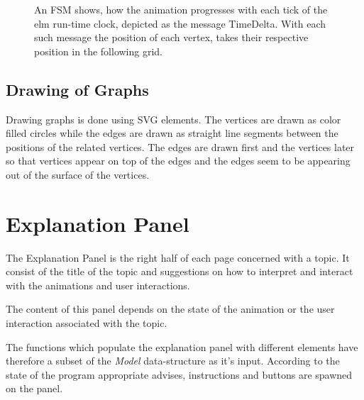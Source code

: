 \begin{figure}[ht] %
\centering %
\caption{ An FSM shows, how the animation progresses with
          each tick of the elm run-time clock, depicted as the message TimeDelta.
          With each such message the position of each vertex, takes their
          respective position in the following grid.
        }
\label{fig: animationFSM}
\end{figure}
\subsection{Drawing of Graphs}
Drawing graphs is done using SVG elements. The vertices are drawn as color
filled circles while the edges are drawn as straight line segments between the
positions of the related vertices. The edges are drawn first and the vertices
later so that vertices appear on top of the edges and the edges seem to be
appearing out of the surface of the vertices.

\section{Explanation Panel}

The Explanation Panel is the right half of each page concerned with a topic. 
It consist of the title of the topic and suggestions on how
to interpret and interact with the animations and user interactions.

The content of this panel depends on the state of the animation or the user
interaction associated with the topic.

The functions which populate the explanation panel with different elements have
therefore a subset of the \emph{Model} data-structure as it's input.  According
to the state of the program appropriate advises, instructions and buttons are
spawned on the panel.

